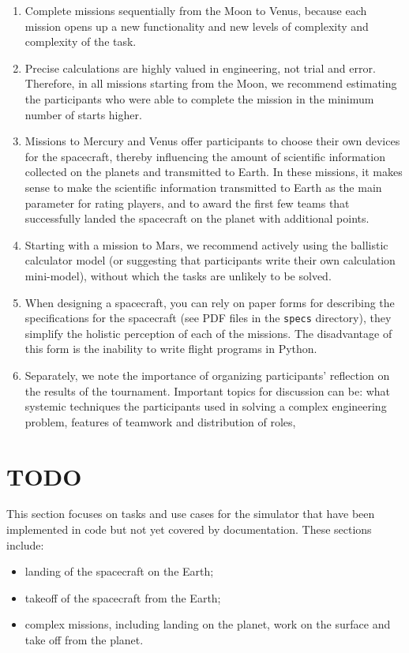 \documentclass[12pt,a4paper]{article}
\begin{document}
\begin{enumerate}
   \item Complete missions sequentially from the Moon to Venus, because each mission opens up a new functionality and new levels of complexity and complexity of the task.
   \item Precise calculations are highly valued in engineering, not trial and error. Therefore, in all missions starting from the Moon, we recommend estimating the participants who were able to complete the mission in the minimum number of starts higher.
   \item Missions to Mercury and Venus offer participants to choose their own devices for the spacecraft, thereby influencing the amount of scientific information collected on the planets and transmitted to Earth. In these missions, it makes sense to make the scientific information transmitted to Earth as the main parameter for rating players, and to award the first few teams that successfully landed the spacecraft on the planet with additional points.
   \item Starting with a mission to Mars, we recommend actively using the ballistic calculator model (or suggesting that participants write their own calculation mini-model), without which the tasks are unlikely to be solved.
   \item When designing a spacecraft, you can rely on paper forms for describing the specifications for the spacecraft (see PDF files in the \verb'specs' directory), they simplify the holistic perception of each of the missions. The disadvantage of this form is the inability to write flight programs in Python.
   \item Separately, we note the importance of organizing participants' reflection on the results of the tournament. Important topics for discussion can be: what systemic techniques the participants used in solving a complex engineering problem, features of teamwork and distribution of roles,
\end{enumerate}

\section{TODO}

This section focuses on tasks and use cases for the simulator that have been implemented in code but not yet covered by documentation. These sections include:

\begin{itemize}
\item landing of the spacecraft on the Earth;
\item takeoff of the spacecraft from the Earth;
\item complex missions, including landing on the planet, work on the surface and take off from the planet.
\end{itemize}
\end{document}
